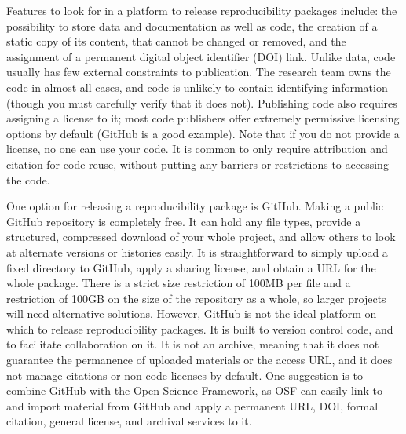 Features to look for in a platform to release reproducibility packages include:
the possibility to store data and documentation as well as code,
the creation of a static copy of its content, that cannot be changed or removed,
and the assignment of a permanent digital object identifier (DOI) link.
Unlike data, code usually has few external constraints to publication.
The research team owns the code in almost all cases,
and code is unlikely to contain identifying information
(though you must carefully verify that it does not).
Publishing code also requires assigning a license to it;
most code publishers offer extremely permissive licensing options by default (GitHub is a good example).
Note that if you do not provide a license, no one can use your code.
It is common to only require attribution and citation for code reuse,
without putting any barriers or restrictions to accessing the code.

One option for releasing a reproducibility package is GitHub.
Making a public GitHub repository is completely free.
It can hold any file types,
provide a structured, compressed download of your whole project,
and allow others to look at alternate versions or histories easily.
It is straightforward to simply upload a fixed directory to GitHub,
apply a sharing license, and obtain a URL for the whole package.
There is a strict size restriction of 100MB per file and
a restriction of 100GB on the size of the repository as a whole,
so larger projects will need alternative solutions.
However, GitHub is not the ideal platform on which to release reproducibility packages.
It is built to version control code, and to facilitate collaboration on it.
It is not an archive, meaning that it does not guarantee the permanence
of uploaded materials or the access URL,
and it does not manage citations or non-code licenses by default.
One suggestion is to combine GitHub with the Open Science Framework,
as OSF can easily link to and import material from GitHub and
apply a permanent URL, DOI, formal citation, general license, and archival services to it.

